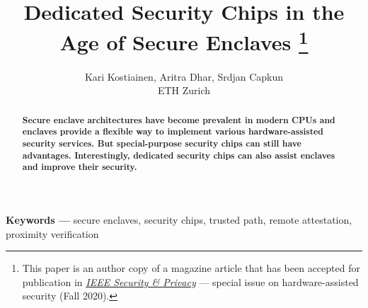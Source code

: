 \documentclass[letterpaper,twocolumn,10pt]{article}
\title{Dedicated Security Chips in the Age of Secure Enclaves
%
\thanks{This paper is an author copy of a magazine article that has been accepted for publication in \href{https://www.computer.org/csdl/magazine/sp}{\emph{IEEE Security \& Privacy}} --- special issue on hardware-assisted security (Fall 2020).}}
\author{Kari Kostiainen, Aritra Dhar, Srdjan Capkun \\ ETH Zurich}
\begin{document}
\maketitle
\thispagestyle{empty}

\begin{abstract}
\textbf{Secure enclave architectures have become prevalent in modern CPUs and enclaves provide a flexible way to implement various hardware-assisted security services. But special-purpose security chips can still have advantages. Interestingly, dedicated security chips can also assist enclaves and improve their security.}
\end{abstract}

\vspace{10pt}
\noindent
\textbf{Keywords ---} secure enclaves, security chips, trusted path, remote attestation, proximity verification








{\small
 

}
 
\end{document}
